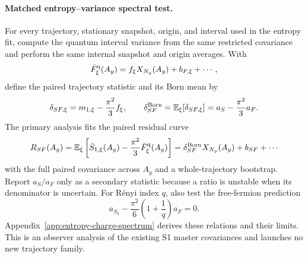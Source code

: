 \documentclass[aps,prx,onecolumn,nofootinbib,superscriptaddress,longbibliography]{revtex4-2}
\newcommand{\E}{\mathbb{E}}
\begin{document}
\paragraph{Matched entropy--variance spectral test.}
For every trajectory, stationary snapshot, origin, and interval used in the entropy fit,
compute the quantum interval variance from the same restricted covariance and perform the
same internal snapshot and origin averages.  With
\begin{equation}
 \bar F_{\xi}^{\rm q}(A_y)
 =f_{\xi}X_{N_y}(A_y)+b_{F,\xi}+\cdots,
 \label{eq:trajectory-charge-variance-fit}
\end{equation}
define the paired trajectory statistic and its Born mean by
\begin{equation}
 \delta_{SF,\xi}=m_{1,\xi}-\frac{\pi^2}{3}f_{\xi},
 \qquad
 \delta_{SF}^{\rm Born}
 =\E_\xi[\delta_{SF,\xi}]
 =a_S-\frac{\pi^2}{3}a_F .
 \label{eq:matched-entropy-variance-slope}
\end{equation}
The primary analysis fits the paired residual curve
\begin{equation}
 R_{SF}(A_y)=\E_\xi\left[
 \bar S_{1,\xi}(A_y)-\frac{\pi^2}{3}
 \bar F_{\xi}^{\rm q}(A_y)\right]
 =\delta_{SF}^{\rm Born}X_{N_y}(A_y)+b_{SF}+\cdots
 \label{eq:matched-entropy-variance-residual}
\end{equation}
with the full paired covariance across $A_y$ and a whole-trajectory bootstrap.  Report
$a_S/a_F$ only as a secondary statistic because a ratio is unstable when its denominator
is uncertain.  For R\'enyi index $q$, also test the free-fermion prediction
\begin{equation}
 a_{S_q}-\frac{\pi^2}{6}\left(1+\frac1q\right)a_F=0 .
 \label{eq:matched-renyi-variance-slope}
\end{equation}
Appendix~\ref{app:entropy-charge-spectrum} derives these relations and their limits.
This is an observer analysis of the existing S1 master covariances and launches no new
trajectory family.
\end{document}
